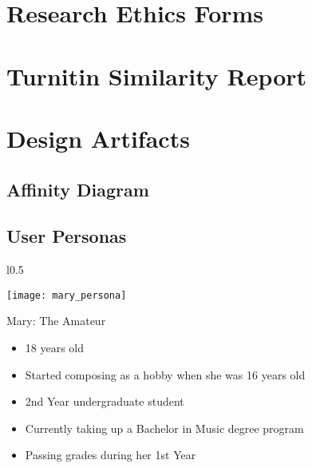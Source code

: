 %
%
%                 

\chapter{Research Ethics Forms}
\label{sec:appendixa}

\chapter{Turnitin Similarity Report}
\label{sec:appendixb}


\chapter{Design Artifacts}
\label{sec:appendixd}

\section{Affinity Diagram}

\newpage
\section{User Personas}
\label{sec:user-personas}

\begin{wrapfigure}{l}{0.5\textwidth}

  \begin{center}
    \texttt{[image: mary\_persona]}
  \end{center}
\end{wrapfigure}


Mary: The Amateur \newline

\begin{itemize}
\item 18 years old
\item Started composing as a hobby when she was 16 years old
\item 2nd Year undergraduate student
\item Currently taking up a Bachelor in Music degree program
\item Passing grades during her 1st Year
\end{itemize}

